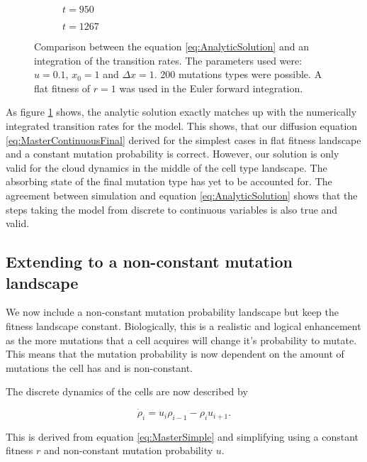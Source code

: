 \documentclass[12pt, a4paper,]{article}
\begin{document}
\begin{figure}[H]
	\begin{subfigure}[h]{0.5 \textwidth}
		
		\caption{$t=950 $}
	\end{subfigure}
	\begin{subfigure}[h]{0.5 \textwidth}
		
		\caption{$t=1267$}
	\end{subfigure}
\caption{Comparison between the equation \eqref{eq:AnalyticSolution} and an integration of the transition rates. The parameters used were: $u = 0.1$, $x_0 =1$ and $\Delta x = 1$. 200 mutations types were possible. A flat fitness of $r=1$ was used in the Euler forward integration. }
\label{fig:fourierEuler}
\end{figure}

As figure \ref{fig:fourierEuler} shows, the analytic solution exactly matches up with the numerically integrated transition rates for the model. This shows, that our diffusion equation \eqref{eq:MasterContinuousFinal} derived for the simplest cases in flat fitness landscape and a constant mutation probability is correct. 
However, our solution is only valid for the cloud dynamics in the middle of the cell type landscape. The absorbing state of the final mutation type has yet to be accounted for. 
The agreement between simulation and equation \eqref{eq:AnalyticSolution} shows that the steps taking the model from discrete to continuous variables is also true and valid. 

\subsection{Extending to a non-constant mutation landscape}
We now include a non-constant mutation probability landscape but keep the fitness landscape constant. Biologically, this is a realistic and logical enhancement as the more mutations that a cell acquires will change it's probability to mutate. This means that the mutation probability is now dependent on the amount of mutations the cell has and is non-constant. 

The discrete dynamics of the cells are now described by 

\begin{equation}
\dot{\rho}_i = u_i \rho _{i-1} - \rho _{i} u_{i+1}.
\end{equation}

This is derived from equation \eqref{eq:MasterSimple} and simplifying using a constant fitness $r$ and non-constant mutation probability $u$.  
\end{document}
